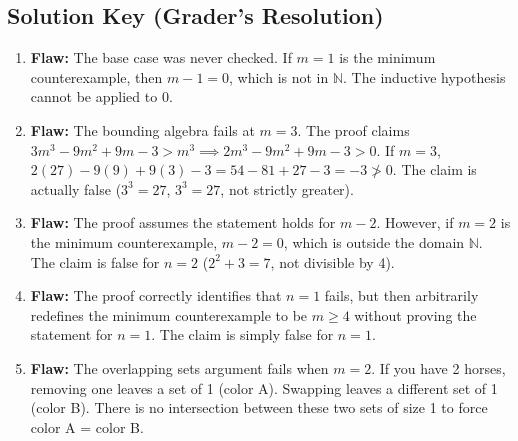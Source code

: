 \documentclass[11pt, a4paper]{article}
\theoremstyle{definition}
\theoremstyle{remark}
\newcommand{\N}{\mathbb{N}}
\begin{document}
\subsection{Solution Key (Grader's Resolution)}
\begin{enumerate}
    \item \textbf{Flaw:} The base case was never checked. If $m=1$ is the minimum counterexample, then $m-1 = 0$, which is not in $\N$. The inductive hypothesis cannot be applied to $0$.
    \item \textbf{Flaw:} The bounding algebra fails at $m=3$. The proof claims $3m^3 - 9m^2 + 9m - 3 > m^3 \implies 2m^3 - 9m^2 + 9m - 3 > 0$. If $m=3$, $2(27) - 9(9) + 9(3) - 3 = 54 - 81 + 27 - 3 = -3 \ngtr 0$. The claim is actually false ($3^3 = 27$, $3^3 = 27$, not strictly greater).
    \item \textbf{Flaw:} The proof assumes the statement holds for $m-2$. However, if $m=2$ is the minimum counterexample, $m-2 = 0$, which is outside the domain $\N$. The claim is false for $n=2$ ($2^2+3=7$, not divisible by 4).
    \item \textbf{Flaw:} The proof correctly identifies that $n=1$ fails, but then arbitrarily redefines the minimum counterexample to be $m \ge 4$ without proving the statement for $n=1$. The claim is simply false for $n=1$.
    \item \textbf{Flaw:} The overlapping sets argument fails when $m=2$. If you have 2 horses, removing one leaves a set of 1 (color A). Swapping leaves a different set of 1 (color B). There is no intersection between these two sets of size 1 to force color A = color B.
\end{enumerate}
\end{document}
